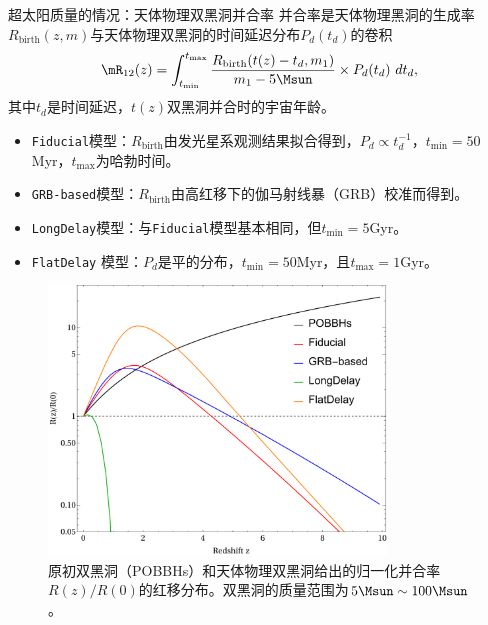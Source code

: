 \documentclass[xcolor={svgnames},compress]{beamer}
\let\olditem\item
\renewcommand{\item}{%
    \olditem\vspace{\fill}}
\def\e{\begin{equation}}
\def\q{\end{equation}}
\begin{document}
\begin{frame}{超太阳质量的情况：天体物理双黑洞并合率}
    并合率是天体物理黑洞的生成率$R_{\mathrm{birth}}(z,m)$与天体物理双黑洞的时间延迟分布$P_d(t_d)$的卷积
    \e\label{sBHR}
    \mR_{12}(z) = \int^{t_{\mathrm{max}}}_{t_{\text{min}}}  
    \frac{R_{\mathrm{birth}}(t(z)-t_d, m_1)}{m_1-5\Msun} \times P_d (t_d)\ d t_d,
    \q
    其中$t_d$是时间延迟，$t(z)$双黑洞并合时的宇宙年龄。
    \begin{itemize}
        \item \texttt{Fiducial}模型：$R_{\mathrm{birth}}$由发光星系观测结果拟合得到，$P_{d} \propto t_{d}^{-1}$，$t_{\mathrm{min}} = 50$\,Myr，$t_{\mathrm{max}}$为哈勃时间。
        
        \item \texttt{GRB-based}模型：$R_{\mathrm{birth}}$由高红移下的伽马射线暴（GRB）校准而得到。
        
        \item \texttt{LongDelay}模型：与\texttt{Fiducial}模型基本相同，但$t_{\mathrm{min}}=5$Gyr。
        
        \item \texttt{FlatDelay} 模型：$P_{d}$是平的分布，$t_{\mathrm{min}}=50$Myr，且$t_{\mathrm{max}}=1$Gyr。
    \end{itemize}    
\end{frame}

\begin{frame}{}
    \begin{figure}[h!]
        \centering
        \includegraphics[width=0.8\textwidth]{R_z.pdf}
        \caption{
            原初双黑洞（POBBHs）和天体物理双黑洞给出的归一化并合率$R(z)/R(0)$的红移分布。双黑洞的质量范围为$5\Msun \sim 100 \Msun$。 
        }
    \end{figure}
\end{frame}
\end{document}
